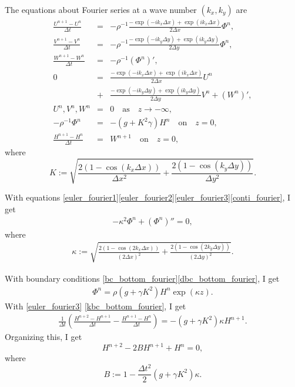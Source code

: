 \documentclass[a4paper,11pt]{article}
\newcommand{\as}{\quad\mathrm{as}\quad}
\newcommand{\on}{\quad\mathrm{on}\quad}
\begin{document}
The equations about Fourier series at a wave number $(k_x, k_y)$ are
\begin{eqnarray}
\frac{U^{n+1}-U^{n}}{\Delta t} &=&
 - \rho^{-1}\frac{- \exp(-i k_x \Delta x) +
 \exp(i k_x \Delta x)}{2\Delta x} \Phi^n
 \label{euler_fourier1}, \\
\frac{V^{n+1}-V^{n}}{\Delta t} &=&
 -\rho^{-1}\frac{-\exp(-i k_y \Delta y) +
 \exp(i k_y \Delta y)}{2\Delta y} \Phi^n,
  \label{euler_fourier2} \\
\frac{W^{n+1}-W^{n}}{\Delta t} &=& -\rho^{-1}(\Phi^n)',
  \label{euler_fourier3} \\
0 &=&\frac{- \exp(- i k_x \Delta x) + \exp(i k_x \Delta x)}{2\Delta x}U^n
  \nonumber\\
&+& \frac{-\exp(- i k_y \Delta y) + \exp(i k_y \Delta y)}{2\Delta y}V^n+(W^n)',
  \label{conti_fourier} \\
U^n,V^n,W^n &=& 0 \as z \to -\infty, \label{bc_bottom_fourier}\\
- \rho^{-1}\Phi^n &=& - (g + K^2 \gamma) H^n \on
 z=0,\label{dbc_bottom_fourier} \\
\frac{H^{n+1} - H^n}{\Delta t} &=& W^{n+1} \on z=0, \label{kbc_bottom_fourier}
\end{eqnarray}
where
\begin{equation}
K := \sqrt{\frac{2(1-\cos (k_x \Delta x))}{\Delta x^2}
          + \frac{2(1-\cos (k_y \Delta y))}{\Delta y^2}}.
\end{equation}

With equations \eqref{euler_fourier1}\eqref{euler_fourier2}\eqref{euler_fourier3}\eqref{conti_fourier}, I get
\begin{eqnarray}
-\kappa^2 \Phi^n + (\Phi^n)'' = 0,
\end{eqnarray}
where
\begin{eqnarray}
\kappa := \sqrt{\frac{2(1-\cos (2k_x \Delta x))}{(2\Delta x)^2}
         + \frac{2(1-\cos (2k_y \Delta y))}{(2\Delta y)^2}}.
\end{eqnarray}

With boundary conditions \eqref{bc_bottom_fourier}\eqref{dbc_bottom_fourier}, I get
\begin{eqnarray}
\Phi^n = \rho(g+\gamma K^2)H^n \exp (\kappa z).
\end{eqnarray}
With \eqref{euler_fourier3} \eqref{kbc_bottom_fourier}, I get
\begin{eqnarray}
\frac{1}{\Delta t}\left(\frac{H^{n+2} - H^{n+1}}{\Delta t}
 - \frac{H^{n+1} - H^{n}}{\Delta t}\right) = -(g+\gamma K^2)\kappa H^{n+1}.
\end{eqnarray}
Organizing this, I get
\begin{equation}
H^{n+2} - 2BH^{n+1} + H^{n} = 0 \label{recurrence2},
\end{equation}
where
\begin{equation}
B := 1 - \frac{\Delta t^2}{2}\left(g + \gamma K^2 \right)\kappa.
\end{equation}
\end{document}
